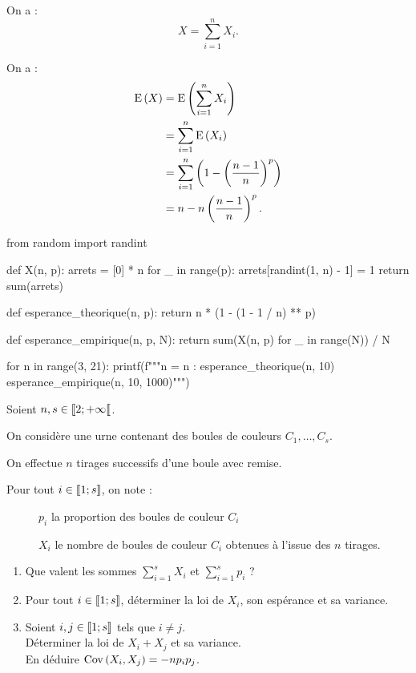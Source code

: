\begin{corr}[1b]
On a : \[X=\sum_{i=1}^nX_i.\]
\end{corr}

\begin{corr}[1c]
On a : \[\begin{aligned}
\operatorname{E}\left(X\right)&=\operatorname{E}\left(\sum_{i=1}^nX_i\right) \\
&=\sum_{i=1}^n\operatorname{E}\left(X_i\right) \\
&=\sum_{i=1}^n\left(1-\left(\dfrac{n-1}{n}\right)^p\right) \\
&=n-n\left(\dfrac{n-1}{n}\right)^p.
\end{aligned}\]
\end{corr}

\begin{corr}[2a et 2b]
\begin{code}
from random import randint

def X(n, p):
    arrets = [0] * n
    for _ in range(p):
        arrets[randint(1, n) - 1] = 1
    return sum(arrets)

def esperance_theorique(n, p):
    return n * (1 - (1 - 1 / n) ** p)

def esperance_empirique(n, p, N):
    return sum(X(n, p) for _ in range(N)) / N

for n in range(3, 21):
    printf(f"""n = {n} :
{esperance_theorique(n, 10)}
{esperance_empirique(n, 10, 1000)}""")
\end{code}
\end{corr}

\begin{exo}[Exercice 9]
Soient \(n,s\in\left\llbracket2;+\infty\right\llbracket\).

On considère une urne contenant des boules de couleurs \(C_1,\dots,C_s\).

On effectue \(n\) tirages successifs d'une boule avec remise.

Pour tout \(i\in\left\llbracket1;s\right\rrbracket\), on note : \begin{description}
    \item[] \(p_i\) la proportion des boules de couleur \(C_i\)
    \item[] \(X_i\) le nombre de boules de couleur \(C_i\) obtenues à l'issue des \(n\) tirages.
\end{description}

\begin{enumerate}
    \item Que valent les sommes \(\sum_{i=1}^sX_i\) et \(\sum_{i=1}^sp_i\) ? \\
    \item Pour tout \(i\in\left\llbracket1;s\right\rrbracket\), déterminer la loi de \(X_i\), son espérance et sa variance. \\
    \item Soient \(i,j\in\left\llbracket1;s\right\rrbracket\) tels que \(i\not=j\). \\ Déterminer la loi de \(X_i+X_j\) et sa variance. \\ En déduire \(\operatorname{Cov}\left(X_i,X_j\right)=-np_ip_j\).
\end{enumerate}
\end{exo}

